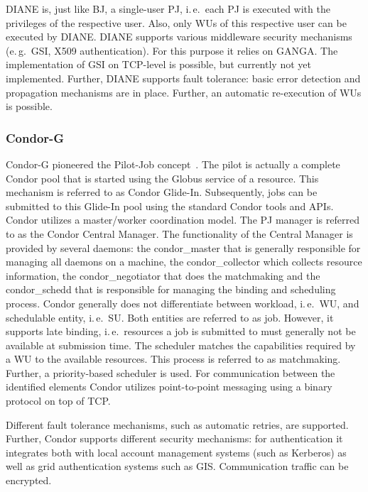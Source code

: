 \documentclass{sig-alternate}
\begin{document}
DIANE is, just like BJ, a single-user PJ, i.\,e.\ each PJ is executed with the
privileges of the respective user. Also, only WUs of this respective user can be
executed by DIANE. DIANE supports various middleware security mechanisms
(e.\,g.\ GSI, X509 authentication). For this purpose it relies on GANGA. The
implementation of GSI on TCP-level is possible, but currently not yet
implemented. Further, DIANE supports fault tolerance: basic error detection and
propagation mechanisms are in place. Further, an automatic re-execution of WUs
is possible.

\subsubsection{Condor-G}
Condor-G pioneered the Pilot-Job concept~\cite{condor-g}. The pilot is
actually a complete Condor pool that is started using the Globus
service of a resource. This mechanism is referred to as Condor
Glide-In. Subsequently, jobs can be submitted to this Glide-In pool
using the standard Condor tools and APIs. Condor utilizes a
master/worker coordination model. The PJ manager is referred to as the
Condor Central Manager. The functionality of the Central Manager is
provided by several daemons: the condor\_master that is generally
responsible for managing all daemons on a machine, the
condor\_collector which collects resource information, the
condor\_negotiator that does the matchmaking and the condor\_schedd
that is responsible for managing the binding and scheduling
process. Condor generally does not differentiate between workload,
i.\,e.\ WU, and schedulable entity, i.\,e.\ SU. Both entities are
referred to as job. However, it supports late binding, i.\,e.\
resources a job is submitted to must generally not be available at
submission time. The scheduler matches the capabilities required by a
WU to the available resources. This process is referred to as
matchmaking. Further, a priority-based scheduler is used. For
communication between the identified elements Condor utilizes
point-to-point messaging using a binary protocol on top of TCP.

Different fault tolerance mechanisms, such as automatic retries, are
supported.  Further, Condor supports different security mechanisms:
for authentication it integrates both with local account management
systems (such as Kerberos) as well as grid authentication systems such
as GIS. Communication traffic can be encrypted.
\end{document}
